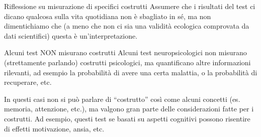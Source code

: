 \documentclass[
  ignorenonframetext,
  aspectratio=169,
]{beamer}
\begin{document}

\begin{frame}{Riflessione su misurazione di specifici costrutti}
\label{riflessione-su-misurazione-di-specifici-costrutti-1}
Assumere che i risultati del test ci dicano qualcosa sulla vita
quotidiana non è sbagliato in sé, ma non dimentichiamo che (a meno che
non ci sia una validità ecologica comprovata da dati scientifici) questa
è un'interpretazione.
\end{frame}

\begin{frame}{Alcuni test NON misurano costrutti}
\label{alcuni-test-non-misurano-costrutti}
Alcuni test neuropsicologici non misurano (strettamente parlando)
costrutti psicologici, ma quantificano altre informazioni rilevanti, ad
esempio la probabilità di avere una certa malattia, o la probabilità di
recuperare, etc.

In questi casi non si può parlare di ``costrutto'' così come alcuni
concetti (es. memoria, attenzione, etc.), ma valgono gran parte delle
considerazioni fatte per i costrutti. Ad esempio, questi test se basati
su aspetti cognitivi possono risentire di effetti motivazione, ansia,
etc.
\end{frame}
\end{document}
